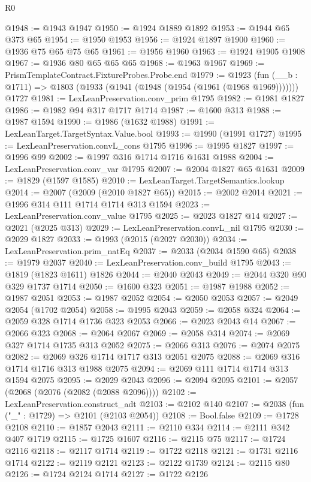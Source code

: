 \begin{lexlean}{R0}
\begin{coremodule}
@1948 := @1943 @1947
@1950 := @1924 @1889 @1892
@1953 := @1944 @65 @373 @65
@1954 := @1950 @1953
@1956 := @1924 @1897 @1900
@1960 := @1936 @75 @65 @75 @65
@1961 := @1956 @1960
@1963 := @1924 @1905 @1908
@1967 := @1936 @80 @65 @65 @65
@1968 := @1963 @1967
@1969 := PrismTemplateContract.FixtureProbes.Probe.end
@1979 := @1923
    (fun (__b : @1711) => @1803 (@1933 (@1941 (@1948 (@1954 (@1961 (@1968 @1969)))))))
    @1727
@1981 := LexLeanPreservation.conv_prim @1795
@1982 := @1981 @1827
@1986 := @1982 @94 @317 @1717 @1714
@1987 := @1600 @313
@1988 := @1987 @1594
@1990 := @1986 (@1632 @1988)
@1991 := LexLeanTarget.TargetSyntax.Value.bool
@1993 := @1990 (@1991 @1727)
@1995 := LexLeanPreservation.convL_cons @1795
@1996 := @1995 @1827
@1997 := @1996 @99
@2002 := @1997 @316 @1714 @1716 @1631 @1988
@2004 := LexLeanPreservation.conv_var @1795
@2007 := @2004 @1827 @65 @1631
@2009 := @1829 (@1597 @1585)
@2010 := LexLeanTarget.TargetSemantics.lookup
@2014 := @2007 (@2009 (@2010 @1827 @65))
@2015 := @2002 @2014
@2021 := @1996 @314 @111 @1714 @1714 @313 @1594
@2023 := LexLeanPreservation.conv_value @1795
@2025 := @2023 @1827 @14
@2027 := @2021 (@2025 @313)
@2029 := LexLeanPreservation.convL_nil @1795
@2030 := @2029 @1827
@2033 := @1993 (@2015 (@2027 @2030))
@2034 := LexLeanPreservation.prim_natEq
@2037 := @2033 (@2034 @1590 @65)
@2038 := @1979 @2037
@2040 := LexLeanPreservation.conv_build @1795
@2043 := @1819 (@1823 @1611) @1826
@2044 := @2040 @2043
@2049 := @2044 @320 @90 @329 @1737 @1714
@2050 := @1600 @323
@2051 := @1987 @1988
@2052 := @1987 @2051
@2053 := @1987 @2052
@2054 := @2050 @2053
@2057 := @2049 @2054 (@1702 @2054)
@2058 := @1995 @2043
@2059 := @2058 @324
@2064 := @2059 @328 @1714 @1736 @323 @2053
@2066 := @2023 @2043 @14
@2067 := @2066 @323
@2068 := @2064 @2067
@2069 := @2058 @314
@2074 := @2069 @327 @1714 @1735 @313 @2052
@2075 := @2066 @313
@2076 := @2074 @2075
@2082 := @2069 @326 @1714 @1717 @313 @2051 @2075
@2088 := @2069 @316 @1714 @1716 @313 @1988 @2075
@2094 := @2069 @111 @1714 @1714 @313 @1594 @2075
@2095 := @2029 @2043
@2096 := @2094 @2095
@2101 := @2057 (@2068 (@2076 (@2082 (@2088 @2096))))
@2102 := LexLeanPreservation.construct_adt
@2103 := @2102 @140
@2107 := @2038 (fun ("_" : @1729) => @2101 (@2103 @2054))
@2108 := Bool.false
@2109 := @1728 @2108
@2110 := @1857 @2043
@2111 := @2110 @334
@2114 := @2111 @342 @407 @1719
@2115 := @1725 @1607
@2116 := @2115 @75
@2117 := @1724 @2116
@2118 := @2117 @1714
@2119 := @1722 @2118
@2121 := @1731 @2116 @1714
@2122 := @2119 @2121
@2123 := @2122 @1739
@2124 := @2115 @80
@2126 := @1724 @2124 @1714
@2127 := @1722 @2126

\end{coremodule}
\end{lexlean}
